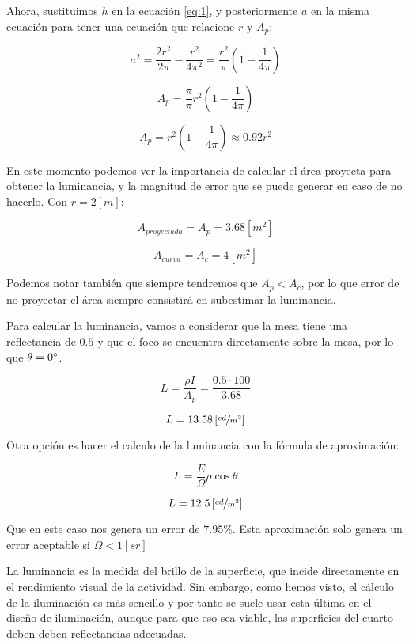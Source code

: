 \documentclass[11pt]{article}
\begin{document}
Ahora, sustituimos $ h $ en la ecuación \ref{eq:1}, y posteriormente $ a $ en la misma ecuación para tener una ecuación que relacione $ r $ y $ A_p $:

\[ a^2 = \frac{ 2 r^2 }{ 2 \pi } - \frac{ r^2 }{ 4 \pi ^2 } = \frac{ r^2 }{\pi } \left( 1 - \frac{ 1 }{ 4 \pi } \right) \]

\[ A_p = \frac{ \pi }{ \pi } r^2 \left( 1 - \frac{ 1 }{ 4 \pi } \right) \]

\[ \boxed{ A_p = r^2 \left( 1 - \frac{ 1 }{ 4 \pi } \right) \approx 0.92 r^2 } \]

En este momento podemos ver la importancia de calcular el área proyecta para obtener la luminancia, y la magnitud de error que se puede generar en caso de no hacerlo. Con $ r = 2 \left[ m \right] $:

\[ A_{ proyectada } = A_p = 3.68 \left[ m^2 \right] \]

\[ A_{ curva} = A_c = 4 \left[ m^2 \right] \]

Podemos notar también que siempre tendremos que $ A_p < A_c $, por lo que error de no proyectar el área siempre consistirá en subestimar la luminancia.

Para calcular la luminancia, vamos a considerar que la mesa tiene una reflectancia de $ 0.5 $ y que el foco se encuentra directamente sobre la mesa, por lo que $ \theta = 0 \degree $.

\[ L = \frac{ \rho I }{ A_p } = \frac{ 0.5 \cdot 100 }{ 3.68 } \]

\[ L = 13.58 \left[ \sfrac{ cd }{ m^2 } \right] \]

Otra opción es hacer el calculo de la luminancia con la fórmula de aproximación:

\[ L = \frac{ E }{ \Omega } \rho \cos \theta \]

\[  L = 12.5 \left[ \sfrac{ cd }{ m^2 } \right] \]

Que en este caso nos genera un error de $ 7.95\% $. Esta aproximación solo genera un error aceptable si $ \Omega < 1 \left[ sr \right] $

La luminancia es la medida del brillo de la superficie, que incide directamente en el rendimiento visual de la actividad. Sin embargo, como hemos visto, el cálculo de la iluminación es más sencillo y por tanto se suele usar esta última en el diseño de iluminación, aunque para que eso sea viable, las superficies del cuarto deben deben reflectancias adecuadas.

\end{document}
